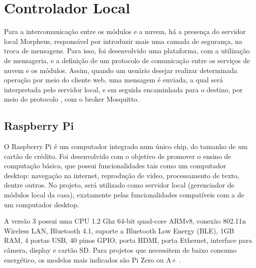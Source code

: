 \section{Controlador Local}
Para a intercomunicação entre os módulos e a nuvem, há a presença do servidor local Morpheus, responsável por introduzir mais uma camada de segurança, na troca de mensagens. Para isso, foi desenvolvido uma plataforma, com a utilização de mensageria, e a definição de um protocolo de comunicação entre os serviços de nuvem e os módulos. Assim, quando um usuário desejar realizar determinada operação por meio do cliente web, uma mensagem é enviada, a qual será interpretada pelo servidor local, e em seguida encaminhada para o destino, por meio do protocolo \wmqtt{}, com o broker Mosquitto.

\subsection{Raspberry Pi}
O Raspberry Pi é um computador integrado num único chip, do tamanho de um cartão de crédito. Foi desenvolvido com o objetivo de promover o ensino de computação básica, que possui funcionalidades tais como um computador desktop: navegação na internet, reprodução de video, processamento de texto, dentre outros. No projeto, será utilizado como servidor local (gerenciador de módulos local da casa), exatamente pelas funcionalidades compatíveis com a de um computador desktop.

A versão 3 possui uma CPU 1.2 Ghz 64-bit quad-core ARMv8, conexão 802.11n Wireless LAN, Bluetooth 4.1, suporte a Bluetooth Low Energy (BLE), 1GB RAM, 4 portas USB, 40 pinos GPIO, porta HDMI, porta Ethernet, interface para câmera, display e cartão SD. Para projetos que necessitem de baixo consumo energético, os modelos mais indicados são Pi Zero ou A+ \cite{raspPi}.
